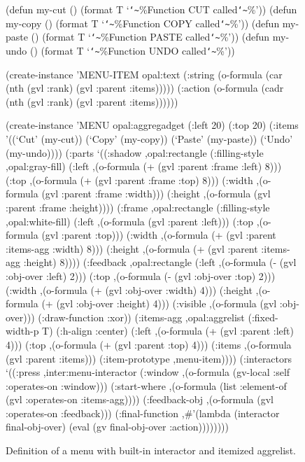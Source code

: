 \begin{figure}
\begin{programexample}
(defun my-cut () (format T `{\tt\char`\~}\%Function CUT called{\tt\char`\~}\%'))
(defun my-copy () (format T `{\tt\char`\~}\%Function COPY called{\tt\char`\~}\%'))
(defun my-paste () (format T `{\tt\char`\~}\%Function PASTE called{\tt\char`\~}\%'))
(defun my-undo () (format T `{\tt\char`\~}\%Function UNDO called{\tt\char`\~}\%'))

(create-instance 'MENU-ITEM opal:text
   (:string (o-formula (car (nth (gvl :rank) (gvl :parent :items)))))
   (:action (o-formula (cadr (nth (gvl :rank)
				  (gvl :parent :items))))))

(create-instance 'MENU opal:aggregadget
   (:left 20) (:top 20)
   (:items '((`Cut' (my-cut)) (`Copy' (my-copy))
             (`Paste' (my-paste)) (`Undo' (my-undo))))
   (:parts
    `((:shadow ,opal:rectangle
	(:filling-style ,opal:gray-fill)
	(:left ,(o-formula (+ (gvl :parent :frame :left) 8)))
	(:top ,(o-formula (+ (gvl :parent :frame :top) 8)))
	(:width ,(o-formula (gvl :parent :frame :width)))
	(:height ,(o-formula (gvl :parent :frame :height))))
      (:frame ,opal:rectangle
	(:filling-style ,opal:white-fill)
	(:left ,(o-formula (gvl :parent :left)))
	(:top ,(o-formula (gvl :parent :top)))
	(:width ,(o-formula (+ (gvl :parent :items-agg :width) 8)))
	(:height ,(o-formula (+ (gvl :parent :items-agg :height) 8))))
      (:feedback ,opal:rectangle
	(:left ,(o-formula (- (gvl :obj-over :left) 2)))
	(:top ,(o-formula (- (gvl :obj-over :top) 2)))
	(:width ,(o-formula (+ (gvl :obj-over :width) 4)))
	(:height ,(o-formula (+ (gvl :obj-over :height) 4)))
	(:visible ,(o-formula (gvl :obj-over)))
	(:draw-function :xor))
      (:items-agg ,opal:aggrelist
	(:fixed-width-p T)
	(:h-align :center)
	(:left ,(o-formula (+ (gvl :parent :left) 4)))
	(:top ,(o-formula (+ (gvl :parent :top) 4)))
	(:items ,(o-formula (gvl :parent :items)))
	(:item-prototype ,menu-item))))
   (:interactors
    `((:press ,inter:menu-interactor
	(:window ,(o-formula (gv-local :self :operates-on :window)))
	(:start-where ,(o-formula (list :element-of
			(gvl :operates-on :items-agg))))
	(:feedback-obj ,(o-formula (gvl :operates-on :feedback)))
	(:final-function
	  ,\#'(lambda (interactor final-obj-over)
		(eval (gv final-obj-over :action))))))))
\end{programexample}
\caption{Definition of a menu with built-in interactor and itemized aggrelist.}
\end{figure}

